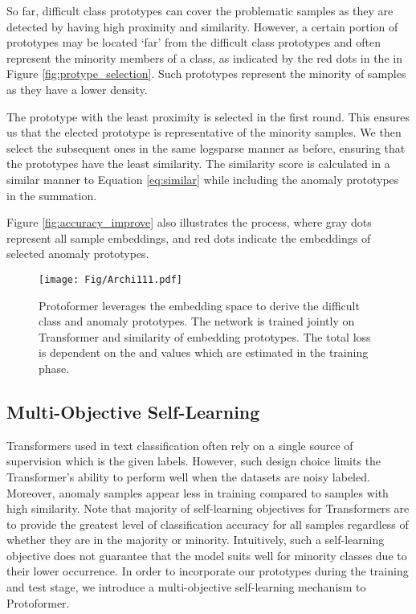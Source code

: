 \documentclass[letterpaper]{article} \usepackage{aaai22}  \usepackage{times}  \usepackage{helvet}  \usepackage{courier}  \usepackage{amsmath,amssymb}
\begin{document}
So far, difficult class prototypes can cover the problematic samples as they are detected by having high proximity and similarity.
However, a certain portion of prototypes may be located `far' from the difficult class prototypes and often represent the minority members of a class, as indicated by the red dots in the in Figure \ref{fig:protype_selection}. Such prototypes represent the minority of samples as they have a lower density.


The prototype with the least proximity  is selected in the first round.
This ensures us that the elected prototype is representative of the minority samples. We then select the subsequent ones in the same logsparse manner as before, ensuring that the prototypes have the least similarity. 
The similarity score is calculated in a similar manner to Equation \eqref{eq:similar} while including the anomaly prototypes in the summation.





Figure \ref{fig:accuracy_improve} also illustrates the process, where gray dots represent all sample embeddings, and red dots indicate the embeddings of selected anomaly prototypes. 




\begin{figure}[!t]
 \centering
 \texttt{[image: Fig/Archi111.pdf]}
 \caption{Protoformer leverages the embedding space to derive the difficult class and anomaly prototypes. The network is trained jointly on Transformer and similarity of embedding prototypes. The total loss is dependent
 on the  and  values which are estimated in the training phase.}
 \label{fig:methodOverview}
  \vspace{-2mm}

\end{figure}

\subsection{Multi-Objective Self-Learning}
\label{subsec:self-learning}
Transformers used in text classification often rely on a single source of supervision which is the given labels. However, such design choice limits the Transformer's ability to perform well when the datasets are noisy labeled. Moreover, anomaly samples appear less in training compared to samples with high similarity. Note that majority of self-learning objectives for Transformers are to provide the greatest level of classification accuracy for all samples regardless of whether they are in the majority or minority. Intuitively, such a self-learning objective does not guarantee that the model suits well for minority classes due to their lower occurrence.
In order to incorporate our prototypes during the training and test stage, we introduce a multi-objective self-learning mechanism to Protoformer.
\end{document}
